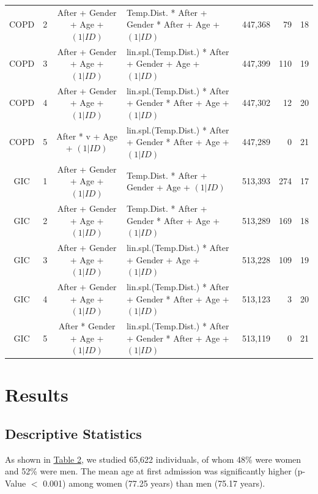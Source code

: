 \begin{landscape}
\begin{table}[htbp]
\begin{tabular}{ccclrrr}
    COPD  & 2     & After + Gender + Age + $(1|ID)$ & Temp.Dist. * After + Gender * After + Age + $(1|ID)$ & 447,368 & 79    & 18 \\
    COPD  & 3     & After + Gender + Age + $(1|ID)$ & lin.spl.(Temp.Dist.) * After + Gender + Age + $(1|ID)$ & 447,399 & 110   & 19 \\
    COPD  & 4     & After + Gender + Age + $(1|ID)$ & lin.spl.(Temp.Dist.) * After + Gender * After + Age + $(1|ID)$ & 447,302 & 12    & 20 \\
    COPD  & 5     & After * v + Age + $(1|ID)$ & lin.spl.(Temp.Dist.) * After + Gender * After + Age + $(1|ID)$ & 447,289 & 0     & 21 \\
    GIC   & 1     & After + Gender + Age + $(1|ID)$ & Temp.Dist. * After + Gender + Age + $(1|ID)$ & 513,393 & 274   & 17 \\
    GIC   & 2     & After + Gender + Age + $(1|ID)$ & Temp.Dist. * After + Gender * After + Age + $(1|ID)$ & 513,289 & 169   & 18 \\
    GIC   & 3     & After + Gender + Age + $(1|ID)$ & lin.spl.(Temp.Dist.) * After + Gender + Age + $(1|ID)$ & 513,228 & 109   & 19 \\
    GIC   & 4     & After + Gender + Age + $(1|ID)$ & lin.spl.(Temp.Dist.) * After + Gender * After + Age + $(1|ID)$ & 513,123 & 3     & 20 \\
    GIC   & 5     & After * Gender + Age + $(1|ID)$ & lin.spl.(Temp.Dist.) * After + Gender * After + Age + $(1|ID)$ & 513,119 & 0     & 21 \\
    \bottomrule
    \bottomrule
    \end{tabular}%
\label{ch3:tab1}
\end{table}%


\end{landscape}




\section{Results}

\subsection{Descriptive Statistics}
As shown in \hyperref[ch3:tab2]{Table 2}, we studied 65,622 individuals, of whom 48\% were women 
and 52\% were men. The mean age at first admission was significantly higher 
(p-Value $<$ 0.001) among women (77.25 years) than men (75.17 years). \\

